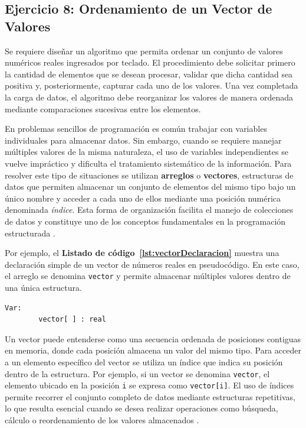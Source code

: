 \documentclass[12pt,twoside]{book}
\begin{document}
				\subsection{Ejercicio 8: Ordenamiento de un Vector de Valores}
					\noindent
					Se requiere diseñar un algoritmo que permita ordenar un conjunto de valores numéricos reales ingresados por teclado. El procedimiento debe solicitar primero la cantidad de elementos que se desean procesar, validar que dicha cantidad sea positiva y, posteriormente, capturar cada uno de los valores. Una vez completada la carga de datos, el algoritmo debe reorganizar los valores de manera ordenada mediante comparaciones sucesivas entre los elementos.
					
					En problemas sencillos de programación es común trabajar con variables individuales para almacenar datos. Sin embargo, cuando se requiere manejar múltiples valores de la misma naturaleza, el uso de variables independientes se vuelve impráctico y dificulta el tratamiento sistemático de la información. Para resolver este tipo de situaciones se utilizan \textbf{arreglos} o \textbf{vectores}, estructuras de datos que permiten almacenar un conjunto de elementos del mismo tipo bajo un único nombre y acceder a cada uno de ellos mediante una posición numérica denominada \emph{índice}. Esta forma de organización facilita el manejo de colecciones de datos y constituye uno de los conceptos fundamentales en la programación estructurada \cite{Sebesta2018Concepts,Gaddis2022Starting}.
					
					Por ejemplo, el \textbf{Listado de código~\ref{lst:vectorDeclaracion}} muestra una declaración simple de un vector de números reales en pseudocódigo. En este caso, el arreglo se denomina \texttt{vector} y permite almacenar múltiples valores dentro de una única estructura.
					
					\begin{lstlisting}[style=upsamStyle,caption={Declaración conceptual de un vector},label={lst:vectorDeclaracion}]
	Var:
		vector[ ] : real \end{lstlisting}
					
					Un vector puede entenderse como una secuencia ordenada de posiciones contiguas en memoria, donde cada posición almacena un valor del mismo tipo. Para acceder a un elemento específico del vector se utiliza un índice que indica su posición dentro de la estructura. Por ejemplo, si un vector se denomina \texttt{vector}, el elemento ubicado en la posición \texttt{i} se expresa como \texttt{vector[i]}. El uso de índices permite recorrer el conjunto completo de datos mediante estructuras repetitivas, lo que resulta esencial cuando se desea realizar operaciones como búsqueda, cálculo o reordenamiento de los valores almacenados \cite{Cormen2022Introduction,Sebesta2018Concepts}.
					
\end{document}

